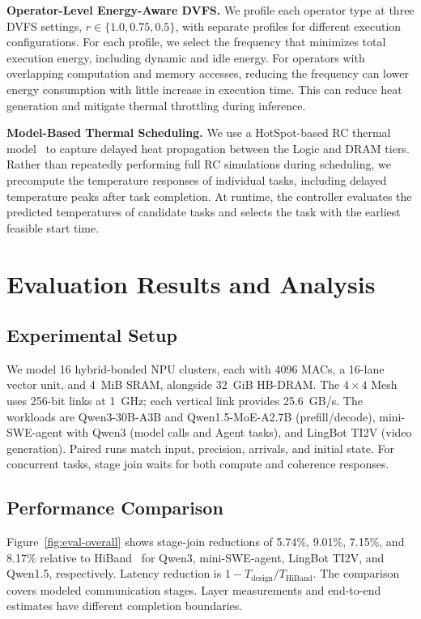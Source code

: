 \documentclass[conference,10pt]{IEEEtran}
\begin{document}
\noindent\textbf{Operator-Level Energy-Aware DVFS.}
We profile each operator type at three DVFS settings, $r\in\{1.0,0.75,0.5\}$, with separate profiles for different execution configurations. For each profile, we select the frequency that minimizes total execution energy, including dynamic and idle energy. For operators with overlapping computation and memory accesses, reducing the frequency can lower energy consumption with little increase in execution time. This can reduce heat generation and mitigate thermal throttling during inference.

\noindent\textbf{Model-Based Thermal Scheduling.}
We use a HotSpot-based RC thermal model~\cite{hotspot_tool} to capture delayed heat propagation between the Logic and DRAM tiers. Rather than repeatedly performing full RC simulations during scheduling, we precompute the temperature responses of individual tasks, including delayed temperature peaks after task completion. At runtime, the controller evaluates the predicted temperatures of candidate tasks and selects the task with the earliest feasible start time.

\FloatBarrier

\section{Evaluation Results and Analysis}
\label{sec:experiment}

\subsection{Experimental Setup}
We model 16 hybrid-bonded NPU clusters, each with 4096 MACs, a 16-lane
vector unit, and 4~MiB SRAM, alongside 32~GiB HB-DRAM. The $4\times4$
Mesh uses 256-bit links at 1~GHz; each vertical link provides 25.6~GB/s.
The workloads are Qwen3-30B-A3B and Qwen1.5-MoE-A2.7B (prefill/decode),
mini-SWE-agent with Qwen3 (model calls and Agent tasks), and LingBot TI2V
(video generation). Paired runs match input, precision, arrivals, and
initial state. For concurrent tasks, stage join waits for both compute
and coherence responses.

\subsection{Performance Comparison}
Figure~\ref{fig:eval-overall} shows stage-join reductions of
5.74\%, 9.01\%, 7.15\%, and 8.17\% relative to HiBand~\cite{wang2026hiband}
for Qwen3, mini-SWE-agent, LingBot TI2V, and Qwen1.5, respectively.
Latency reduction is $1-T_{\mathrm{design}}/T_{\mathrm{HiBand}}$.
The comparison covers modeled communication stages. Layer measurements and
end-to-end estimates have different completion boundaries.
\end{document}
